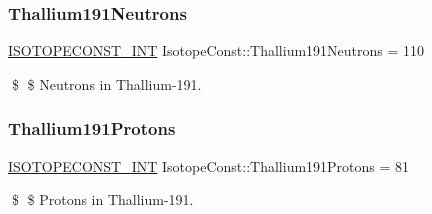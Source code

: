 \subsubsection{\texorpdfstring{Thallium191\+Neutrons}{Thallium191Neutrons}}
{\footnotesize\ttfamily \mbox{\hyperlink{group___isotope_const-_macros_ga5f18360b3e99483a35c32d789e62621c}{I\+S\+O\+T\+O\+P\+E\+C\+O\+N\+S\+T\+\_\+\+I\+NT}} Isotope\+Const\+::\+Thallium191\+Neutrons = 110}

\$ \$ Neutrons in Thallium-\/191. \mbox{\label{group___isotope_const-_thallium-_tl191_ga91b71acd4dd317a1e9c7a35c184f1c11}} 
\subsubsection{\texorpdfstring{Thallium191\+Protons}{Thallium191Protons}}
{\footnotesize\ttfamily \mbox{\hyperlink{group___isotope_const-_macros_ga5f18360b3e99483a35c32d789e62621c}{I\+S\+O\+T\+O\+P\+E\+C\+O\+N\+S\+T\+\_\+\+I\+NT}} Isotope\+Const\+::\+Thallium191\+Protons = 81}

\$ \$ Protons in Thallium-\/191. 